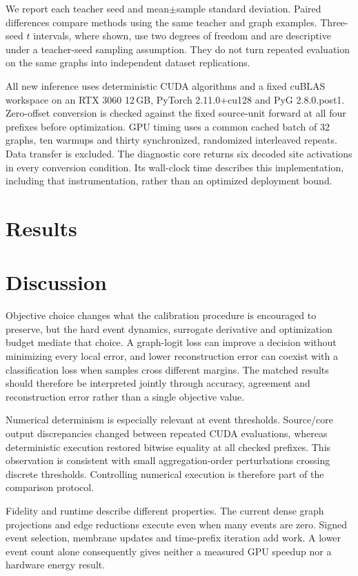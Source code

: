 \documentclass[10pt,twocolumn]{article}
\begin{document}
We report each teacher seed and mean$\pm$sample standard deviation. Paired differences compare methods using the same teacher and graph examples. Three-seed $t$ intervals, where shown, use two degrees of freedom and are descriptive under a teacher-seed sampling assumption. They do not turn repeated evaluation on the same graphs into independent dataset replications.

All new inference uses deterministic CUDA algorithms and a fixed cuBLAS workspace on an RTX 3060 12\,GB, PyTorch 2.11.0+cu128 and PyG 2.8.0.post1. Zero-offset conversion is checked against the fixed source-unit forward at all four prefixes before optimization. GPU timing uses a common cached batch of 32 graphs, ten warmups and thirty synchronized, randomized interleaved repeats. Data transfer is excluded. The diagnostic core returns six decoded site activations in every conversion condition. Its wall-clock time describes this implementation, including that instrumentation, rather than an optimized deployment bound.

\section{Results}\label{sec:results}


\section{Discussion}
Objective choice changes what the calibration procedure is encouraged to preserve, but the hard event dynamics, surrogate derivative and optimization budget mediate that choice. A graph-logit loss can improve a decision without minimizing every local error, and lower reconstruction error can coexist with a classification loss when samples cross different margins. The matched results should therefore be interpreted jointly through accuracy, agreement and reconstruction error rather than a single objective value.

Numerical determinism is especially relevant at event thresholds. Source/core output discrepancies changed between repeated CUDA evaluations, whereas deterministic execution restored bitwise equality at all checked prefixes. This observation is consistent with small aggregation-order perturbations crossing discrete thresholds. Controlling numerical execution is therefore part of the comparison protocol.

Fidelity and runtime describe different properties. The current dense graph projections and edge reductions execute even when many events are zero. Signed event selection, membrane updates and time-prefix iteration add work. A lower event count alone consequently gives neither a measured GPU speedup nor a hardware energy result.
\end{document}
